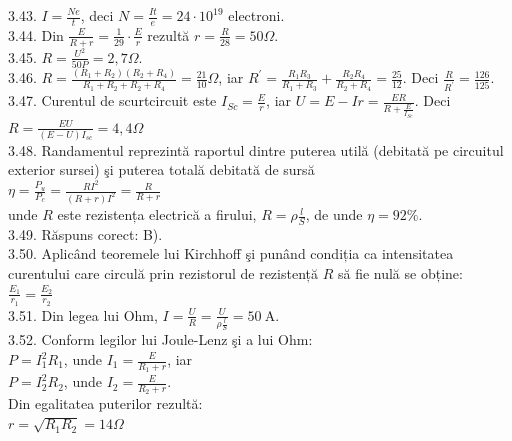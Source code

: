 3.43. $I=\frac{N e}{t}$, deci $N=\frac{I t}{e}=24 \cdot 10^{19}$ electroni.\\

3.44. Din $\frac{E}{R+r}=\frac{1}{29} \cdot \frac{E}{r}$ rezultă $r=\frac{R}{28}=50 \Omega$.\\

3.45. $R=\frac{U^{2}}{50 P}=2,7 \Omega$.\\

3.46. $R=\frac{\left(R_{1}+R_{2}\right)\left(R_{2}+R_{4}\right)}{R_{1}+R_{2}+R_{2}+R_{4}}=\frac{21}{10} \Omega$, iar $R^{\prime}=\frac{R_{1} R_{3}}{R_{1}+R_{3}}+\frac{R_{2} R_{4}}{R_{2}+R_{4}}=\frac{25}{12}$. Deci $\frac{R}{R^{\prime}}=\frac{126}{125}$.\\

3.47. Curentul de scurtcircuit este $I_{S c}=\frac{E}{r}$, iar $U=E-I r=\frac{E R}{R+\frac{E}{I_{S c}}}$. Deci\\ $R=\frac{E U}{(E-U) I_{s c}}=4,4 \Omega$\\

3.48. Randamentul reprezintă raportul dintre puterea utilă (debitată pe circuitul exterior sursei) şi puterea totală debitată de sursă\\ $\eta=\frac{P_{u}}{P_{c}}=\frac{R I^{2}}{(R+r) I^{2}}=\frac{R}{R+r}$\\ unde $R$ este rezistența electrică a firului, $R=\rho \frac{l}{S}$, de unde $\eta=92 \%$.\\

3.49. Răspuns corect: B).\\

3.50. Aplicând teoremele lui Kirchhoff şi punând condiția ca intensitatea curentului care circulă prin rezistorul de rezistență $R$ să fie nulă se obține:\\ $\frac{E_{1}}{r_{1}}=\frac{E_{2}}{r_{2}}$\\

3.51. Din legea lui Ohm, $I=\frac{U}{R}=\frac{U}{\rho \frac{l}{S}}=50 \mathrm{~A}$.\\

3.52. Conform legilor lui Joule-Lenz şi a lui Ohm:\\ $P=I_{1}^{2} R_{1}$, unde $I_{1}=\frac{E}{R_{1}+r}$, iar\\ $P=I_{2}^{2} R_{2}$, unde $I_{2}=\frac{E}{R_{2}+r}$.\\ Din egalitatea puterilor rezultă:\\ $r=\sqrt{R_{1} R_{2}}=14 \Omega$\\

